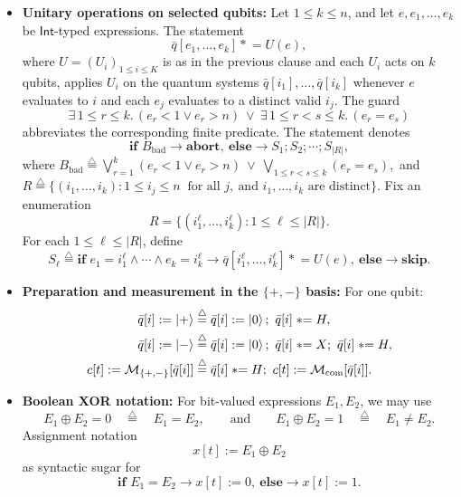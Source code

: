 \documentclass[acmsmall,screen,review,anonymous,nonacm]{acmart}
\theoremstyle{defn_style}
\newcommand{\asteq}{\mathrel{*}=}
\begin{document}
\begin{itemize}
    \item \textbf{Unitary operations on selected qubits:}
    Let \(1\le k\le n\), and let \(e,e_1,\ldots,e_k\) be
    \(\mathsf{Int}\)-typed expressions. The statement
    \[
    \bar q[e_1,\ldots,e_k]\asteq U(e),
    \]
    where \(U=(U_i)_{1\le i\le K}\) is as in the previous clause and each
    \(U_i\) acts on \(k\) qubits, applies \(U_i\) on the quantum systems
    \(\bar q[i_1],\ldots,\bar q[i_k]\) whenever \(e\) evaluates to \(i\)
    and each \(e_j\) evaluates to a distinct valid \(i_j\). The guard
    \[
    \exists\,1\le r\le k.\,(e_r<1\lor e_r>n)
    \ \lor\
    \exists\,1\le r<s\le k.\,(e_r=e_s)
    \]
    abbreviates the corresponding finite predicate. The statement denotes
    \[
    \textbf{if } B_{\mathrm{bad}}\rightarrow \textbf{abort},
    \ \textbf{else}\rightarrow S_1;S_2;\cdots;S_{|R|},
    \]
    where
    \(B_{\mathrm{bad}}
    \stackrel{\triangle}{=}
    \bigvee_{r=1}^{k}(e_r<1\lor e_r>n)
    \ \lor\
    \bigvee_{1\le r<s\le k}(e_r=e_s),\)
    and
    \(R
    \stackrel{\triangle}{=}
    \{(i_1,\ldots,i_k):
    1\le i_j\le n\ \text{ for all }j,\ \text{and }i_1,\ldots,i_k
    \text{ are distinct}\}.\)
    Fix an enumeration
    \[
    R=\{(i_1^\ell,\ldots,i_k^\ell):1\le \ell\le |R|\}.
    \]
    For each \(1\le \ell\le |R|\), define
    \[
    S_\ell
    \stackrel{\triangle}{=}
    \textbf{if }e_1=i_1^\ell\land\cdots\land e_k=i_k^\ell
    \rightarrow
    \bar q[i_1^\ell,\ldots,i_k^\ell]\asteq U(e),
    \ \textbf{else}\rightarrow\mathbf{skip}.
    \]

    \item \textbf{Preparation and measurement in the \(\{+,-\}\) basis:}
    For one qubit:
    \begin{align*}
        \bar q[i] := \ket{+}
        &\stackrel{\triangle}{=}
        \bar q[i] := \ket{0};\ \bar q[i]\asteq H,\\
        \bar q[i] := \ket{-}
        &\stackrel{\triangle}{=}
        \bar q[i] := \ket{0};\ \bar q[i]\asteq X;\ \bar q[i]\asteq H,\\
        c[t] := \mathcal M_{\{+,-\}}[\bar q[i]]
        &\stackrel{\triangle}{=}
        \bar q[i]\asteq H;\ c[t]:=\mathcal M_{\mathrm{com}}[\bar q[i]].
    \end{align*}

    \item \textbf{Boolean XOR notation:}
    For bit-valued expressions \(E_1,E_2\), we may use
    \[
    E_1\oplus E_2=0
    \quad\stackrel{\triangle}{=}\quad
    E_1=E_2,
    \qquad\text{and}\qquad
    E_1\oplus E_2=1
    \quad\stackrel{\triangle}{=}\quad
    E_1\neq E_2.
    \]
    Assignment notation
    \[
    x[t] := E_1\oplus E_2
    \]
    as syntactic sugar for
    \[
    \textbf{if } E_1=E_2 \rightarrow x[t]:=0,
    \ \textbf{else}\rightarrow x[t]:=1.
    \]



\end{itemize}
\end{document}
